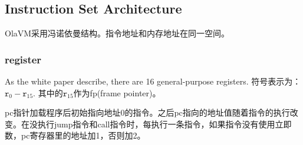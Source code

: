 \subsection{Instruction Set Architecture}\label{subsec: processor-instructions-executor}
OlaVM采用冯诺依曼结构。指令地址和内存地址在同一空间。

\subsubsection{register}\label{subsec: processor-register}

As the white paper describe, there are 16 general-purpose registers.
符号表示为：$\texttt{r}_0 - \texttt{r}_{15}$.
其中的$\texttt{r}_{15}$作为fp(frame pointer)。

pc指针加载程序后初始指向地址0的指令。之后pc指向的地址值随着指令的执行改变。在没执行jump指令和call指令时，每执行一条指令，如果指令没有使用立即数，pc寄存器里的地址加1，否则加2。

